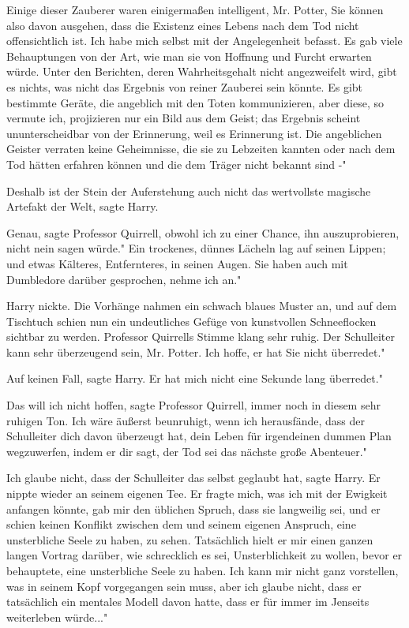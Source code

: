 \glqq{}Einige dieser Zauberer waren einigermaßen intelligent, Mr. Potter, Sie
können also davon ausgehen, dass die Existenz eines Lebens nach dem Tod nicht
offensichtlich ist. Ich habe mich selbst mit der Angelegenheit befasst. Es gab
viele Behauptungen von der Art, wie man sie von Hoffnung und Furcht erwarten
würde. Unter den Berichten, deren Wahrheitsgehalt nicht angezweifelt wird, gibt
es nichts, was nicht das Ergebnis von reiner Zauberei sein könnte. Es gibt
bestimmte Geräte, die angeblich mit den Toten kommunizieren, aber diese, so
vermute ich, projizieren nur ein Bild aus dem Geist; das Ergebnis scheint
ununterscheidbar von der Erinnerung, weil es Erinnerung ist. Die angeblichen
Geister verraten keine Geheimnisse, die sie zu Lebzeiten kannten oder nach dem
Tod hätten erfahren können und die dem Träger nicht bekannt sind -"

\glqq{}Deshalb ist der Stein der Auferstehung auch nicht das wertvollste magische
Artefakt der Welt\grqq{}, sagte Harry.

\glqq{}Genau\grqq{}, sagte Professor Quirrell, \glqq{}obwohl ich zu einer Chance,
ihn auszuprobieren, nicht nein sagen würde." Ein trockenes, dünnes Lächeln lag
auf seinen Lippen; und etwas Kälteres, Entfernteres, in seinen Augen. \glqq{}Sie
haben auch mit Dumbledore darüber gesprochen, nehme ich an."

Harry nickte. Die Vorhänge nahmen ein schwach blaues Muster an, und auf dem
Tischtuch schien nun ein undeutliches Gefüge von kunstvollen Schneeflocken
sichtbar zu werden. Professor Quirrells Stimme klang sehr ruhig. \glqq{}Der
Schulleiter kann sehr überzeugend sein, Mr. Potter. Ich hoffe, er hat Sie nicht
überredet."

\glqq{}Auf keinen Fall\grqq{}, sagte Harry. \glqq{}Er hat mich nicht eine Sekunde
lang überredet."

\glqq{}Das will ich nicht hoffen\grqq{}, sagte Professor Quirrell, immer noch in
diesem sehr ruhigen Ton. \glqq{}Ich wäre äußerst beunruhigt, wenn ich
herausfände, dass der Schulleiter dich davon überzeugt hat, dein Leben für
irgendeinen dummen Plan wegzuwerfen, indem er dir sagt, der Tod sei das nächste
große Abenteuer."

\glqq{}Ich glaube nicht, dass der Schulleiter das selbst geglaubt hat\grqq{},
sagte Harry. Er nippte wieder an seinem eigenen Tee. \glqq{}Er fragte mich, was
ich mit der Ewigkeit anfangen könnte, gab mir den üblichen Spruch, dass sie
langweilig sei, und er schien keinen Konflikt zwischen dem und seinem eigenen
Anspruch, eine unsterbliche Seele zu haben, zu sehen. Tatsächlich hielt er mir
einen ganzen langen Vortrag darüber, wie schrecklich es sei, Unsterblichkeit zu
wollen, bevor er behauptete, eine unsterbliche Seele zu haben. Ich kann mir
nicht ganz vorstellen, was in seinem Kopf vorgegangen sein muss, aber ich glaube
nicht, dass er tatsächlich ein mentales Modell davon hatte, dass er für immer im
Jenseits weiterleben würde..."

